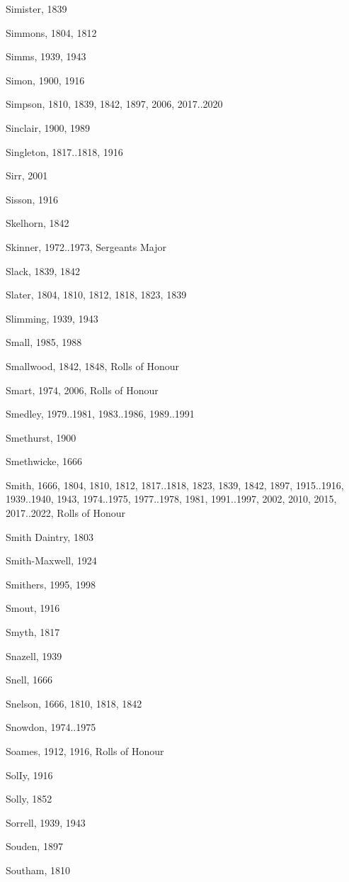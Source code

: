 {\begin{theindex}
\item Simister, 1839
\item Simmons, 1804, 1812
\item Simms, 1939, 1943
\item Simon, 1900, 1916
\item Simpson, 1810, 1839, 1842, 1897, 2006, 2017..2020
\item Sinclair, 1900, 1989
\item Singleton, 1817..1818, 1916
\item Sirr, 2001
\item Sisson, 1916
\item Skelhorn, 1842
\item Skinner, 1972..1973, Sergeants Major
\item Slack, 1839, 1842
\item Slater, 1804, 1810, 1812, 1818, 1823, 1839
\item Slimming, 1939, 1943
\item Small, 1985, 1988
\item Smallwood, 1842, 1848, Rolls of Honour
\item Smart, 1974, 2006, Rolls of Honour
\item Smedley, 1979..1981, 1983..1986, 1989..1991
\item Smethurst, 1900
\item Smethwicke, 1666
\item Smith, 1666, 1804, 1810, 1812, 1817..1818, 1823, 1839, 1842, 1897, 1915..1916, 1939..1940, 1943, 1974..1975, 1977..1978, 1981, 1991..1997, 2002, 2010, 2015, 2017..2022, Rolls of Honour
\item Smith Daintry, 1803
\item Smith-Maxwell, 1924
\item Smithers, 1995, 1998
\item Smout, 1916
\item Smyth, 1817
\item Snazell, 1939
\item Snell, 1666
\item Snelson, 1666, 1810, 1818, 1842
\item Snowdon, 1974..1975
\item Soames, 1912, 1916, Rolls of Honour
\item SolIy, 1916
\item Solly, 1852
\item Sorrell, 1939, 1943
\item Souden, 1897
\item Southam, 1810

\end{theindex}}

